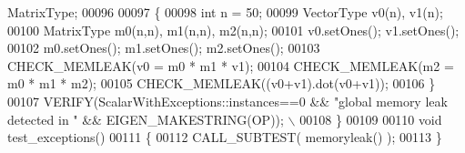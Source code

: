 \begin{DoxyCode}
       MatrixType;
00096   
00097   \{
00098     \textcolor{keywordtype}{int} n = 50;
00099     VectorType v0(n), v1(n);
00100     MatrixType m0(n,n), m1(n,n), m2(n,n);
00101     v0.setOnes(); v1.setOnes();
00102     m0.setOnes(); m1.setOnes(); m2.setOnes();
00103     CHECK\_MEMLEAK(v0 = m0 * m1 * v1);
00104     CHECK\_MEMLEAK(m2 = m0 * m1 * m2);
00105     CHECK\_MEMLEAK((v0+v1).dot(v0+v1));
00106   \}
00107   VERIFY(ScalarWithExceptions::instances==0 && \textcolor{stringliteral}{"global memory leak detected in "} && EIGEN\_MAKESTRING(OP)); 
      \(\backslash\)
00108 \}
00109 
00110 \textcolor{keywordtype}{void} test\_exceptions()
00111 \{
00112   CALL\_SUBTEST( memoryleak() );
00113 \}
\end{DoxyCode}
